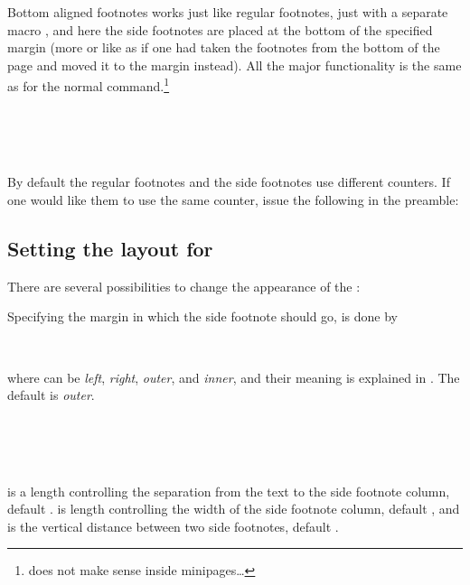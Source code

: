Bottom aligned footnotes works just like regular footnotes, just with
a separate macro \cmd{\sidefootenote}, and here the side
footnotes are placed at the bottom of the specified margin (more or
like as if one had taken the footnotes from the bottom of the page and
moved it to the margin instead). All the major functionality is the
same as for the normal \cmd{\footnote}
command.\footnote{ does not make sense inside
  minipages\dots}
\begin{syntax}
  \cmd{\sidefootnote}\\
  \cmd{\sidefootnotemark}\\
  \cmd{\sidefootnotetext}\\
\end{syntax}

By default the regular footnotes and the side footnotes use different
counters. If one would like them to use the same counter, issue the
following in the preamble:
\begin{lcode}
\end{lcode}


\subsection{Setting the layout for
  \texorpdfstring{}{sidefootnote}} 
\label{sec:sett-layo-texorpdfst}



There are several possibilities to change the appearance of the
\cmd{\sidefootnote}:

Specifying the margin in which the side footnote should go, is done by 
\begin{syntax}
  \cmd{\sidefootmargin}\\
\end{syntax}
where  can be \emph{left}, \emph{right}, \emph{outer}, and
\emph{inner}, and their meaning is explained in
. The default is \emph{outer}.

\begin{syntax}
  \lnc{\sidefoothsep}\\
  \lnc{\sidefootwidth}\\
  \lnc{\sidefootvsep}\\
\end{syntax}
\cmd{\sidefoothsep} is a length controlling the separation from the
text to the side footnote column, default
\cmd{\marginparsep}. \cmd{\sidefootwidth} is length controlling the
width of the side footnote column, default \cmd{\marginparwidth}, and
\cmd{\sidefootvsep} is the vertical distance between two side
footnotes, default \cmd{\onelineskip}.

